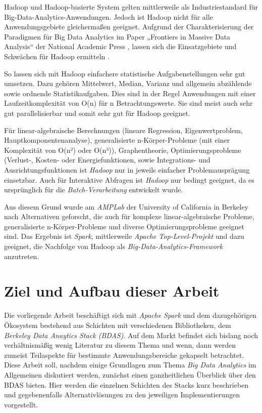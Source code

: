Hadoop und Hadoop-basierte System gelten mittlerweile als Industriestandard für Big-Data-Analytics-Anwendungen. Jedoch ist Hadoop nicht für alle Anwendungsgebiete gleichermaßen geeignet. Aufgrund der Charakterisierung der Paradigmen für Big Data Analytics im Paper „Frontiers in Massive Data Analysis“ der National Academic Press , lassen sich die Einsatzgebiete und Schwächen für Hadoop ermitteln .

So lassen sich mit Hadoop einfachere statistische Aufgabenstellungen sehr gut umsetzen. Dazu gehören Mittelwert, Median, Varianz und allgemein abzählende sowie ordnende Statistikaufgaben. Dies sind in der Regel Anwendungen mit einer Laufzeitkomplexität von O(n) für n Betrachtungswerte. Sie sind meist auch sehr gut parallelisierbar und somit sehr gut für Hadoop geeignet.    



Für linear-algebraische Berechnungen (lineare Regression, Eigenwertproblem, Hauptkomponentenanalyse), generalisierte n-Körper-Probleme (mit einer Komplexität 
von O(n²) oder O(n³)), Graphentheorie, Optimierungsprobleme (Verlust-, Kosten- oder Energiefunktionen, sowie  Integrations- und Ausrichtungsfunktionen ist \textit{Hadoop} nur in jeweils einfacher Problemausprägung einsetzbar. Auch für Interaktive Abfragen ist \textit{Hadoop} nur bedingt geeignet, da es ursprünglich für die \textit{Batch-Verarbeitung} entwickelt wurde.

Aus diesem Grund wurde am \textit{AMPLab} der University of California in Berkeley nach Alternativen geforscht, die auch für komplexe linear-algebraische Probleme, generalisierte n-Körper-Probleme und diverse Optimierungsprobleme geeignet sind. Das Ergebnis ist \textit{Spark}, mittlerweile \textit{Apache Top-Level-Projekt} und dazu geeignet, die Nachfolge von Hadoop als \textit{Big-Data-Analytics-Framework} anzutreten. 

\section{Ziel und Aufbau dieser Arbeit}
\label{section:ziel dieser Arbeit}

Die vorliegende Arbeit beschäftigt sich mit \textit{Apache Spark} und dem dazugehörigen Ökosystem bestehend aus Schichten mit verschiedenen Bibliotheken, dem \textit{Berkeley Data Anaytics Stack (BDAS)}. Auf dem Markt befindet sich bislang noch verhältnismäßig wenig Literatur zu diesem Thema und wenn, dann werden zumeist Teilaspekte für bestimmte Anwendungsbereiche gekapselt betrachtet. Diese Arbeit soll, nachdem einige Grundlagen zum Thema \textit{Big Data Analytics} im Allgemeinen diskutiert werden, zunächst einen ganzheitlichen Überblick über den BDAS bieten. Hier werden die einzelnen Schichten des Stacks kurz beschrieben und gegebenenfalls Alternativlösungen zu den jeweiligen Implementierungen vorgestellt. 

